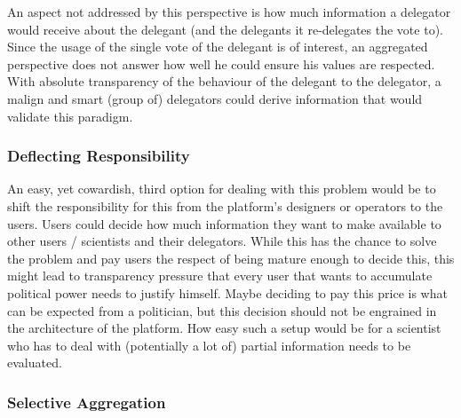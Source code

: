 An aspect not addressed by this perspective is how much information a delegator would receive about the delegant (and the delegants it re-delegates the vote to). Since the usage of the single vote of the delegant is of interest, an aggregated perspective does not answer how well he could ensure his values are respected. With absolute transparency of the behaviour of the delegant to the delegator, a malign and smart (group of) delegators could derive information that would validate this paradigm.

\subsubsection{Deflecting Responsibility}

An easy, yet cowardish, third option for dealing with this problem would be to shift the responsibility for this from the platform's designers or operators to the users. Users could decide how much information they want to make available to other users / scientists and their delegators. While this has the chance to solve the problem and pay users the respect of being mature enough to decide this, this might lead to transparency pressure that every user that wants to accumulate political power needs to justify himself. Maybe deciding to pay this price is what can be expected from a politician, but this decision should not be engrained in the architecture of the platform. How easy such a setup would be for a scientist who has to deal with (potentially a lot of) partial information needs to be evaluated.

\subsubsection{Selective Aggregation}

